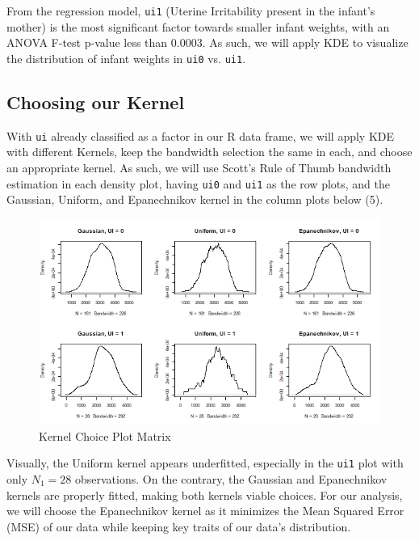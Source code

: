 \documentclass{article}
\begin{document}
From the regression model, \texttt{ui1} (Uterine Irritability present in the infant's mother) is the most significant factor towards smaller infant weights, with an ANOVA F-test p-value less than 0.0003. As such, we will apply KDE to visualize the distribution of infant weights in \texttt{ui0} vs. \texttt{ui1}.

\subsection{Choosing our Kernel}

With \texttt{ui} already classified as a factor in our R data frame, we will apply KDE with different Kernels, keep the bandwidth selection the same in each, and choose an appropriate kernel. As such, we will use Scott's Rule of Thumb bandwidth estimation in each density plot, having \texttt{ui0} and \texttt{ui1} as the row plots, and the Gaussian, Uniform, and Epanechnikov kernel in the column plots below (5).

\newpage

\begin{figure}[h]
    \centering
    \includegraphics[scale = 0.4]{volume/KDE_kernel_choices.png}
    \caption{Kernel Choice Plot Matrix}
    \label{fig:kernel-choices}
\end{figure}

Visually, the Uniform kernel appears underfitted, especially in the \texttt{ui1} plot with only $N_1 = 28$ observations. On the contrary, the Gaussian and Epanechnikov kernels are properly fitted, making both kernels viable choices. For our analysis, we will choose the Epanechnikov kernel as it minimizes the Mean Squared Error (MSE) of our data \cite{refId0} while keeping key traits of our data's distribution.
\end{document}

